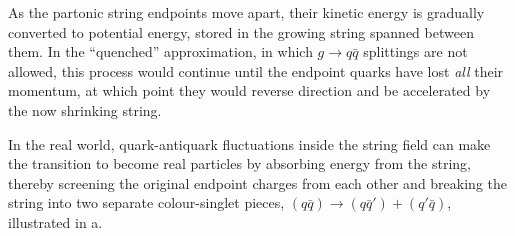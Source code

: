 As the partonic string endpoints move apart, their kinetic energy is gradually
converted to potential energy, stored in the growing string spanned
between them. In the ``quenched'' approximation, in which $g\to
q\bar{q}$ splittings are not allowed, this process would continue
until the endpoint quarks have lost \emph{all} their
momentum, at which point they would reverse direction and be
accelerated by the now shrinking string. 

In the real world,
 quark-antiquark fluctuations inside the string field
can make the transition to become real particles by absorbing 
energy from the string, thereby screening the original endpoint 
charges from each other and breaking the string into two separate
colour-singlet pieces, $(q\bar{q}) \to
(q\bar{q}')+(q'\bar{q})$, illustrated in \!a.
\begin{figure}[t]
\centering
{}
\end{figure}
